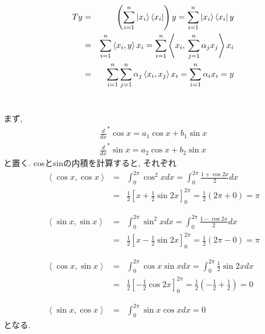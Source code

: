 \documentclass[a4paper,11pt]{jsarticle}
\begin{document}
\section{}
\begin{eqnarray*}
  Ty &=& \left(\sum_{i=1}^n\Ket{x_i}\Bra{x_i}\right)y
    = \sum_{i=1}^n\Ket{x_i}\Bra{x_i}y \\
  &=& \sum_{i=1}^n\left<x_i, y\right>x_i
    = \sum_{i=1}^n\left<x_i, \hspace{2pt}\sum_{j=1}^n\alpha_j x_j\right>x_i \\
  &=& \sum_{i=1}^n\sum_{j=1}^n\alpha_j\left<x_i, x_j\right>x_i
    = \sum_{i=1}^n\alpha_ix_i = y
\end{eqnarray*}

\section{}
まず, 
\begin{eqnarray*}
  \frac{d}{dx}^*\cos{x} = a_1\cos{x} + b_1\sin{x} \\
  \frac{d}{dx}^*\sin{x} = a_2\cos{x} + b_2\sin{x}
\end{eqnarray*}
と置く. cosとsinの内積を計算すると, それぞれ
\begin{eqnarray*}
  \left<\cos{x}, \cos{x}\right> &=& \int_0^{2\pi}\cos^2{x}dx = \int_0^{2\pi}\frac{1+\cos{2x}}{2}dx \\
  &=& \frac{1}{2}\left[x + \frac{1}{2}\sin{2x}\right]_0^{2\pi}
  = \frac{1}{2}\left(2\pi + 0\right) = \pi \\
  \\\\
  \left<\sin{x}, \sin{x}\right> &=& \int_0^{2\pi}\sin^2{x}dx = \int_0^{2\pi}\frac{1-\cos{2x}}{2}dx \\
  &=& \frac{1}{2}\left[x - \frac{1}{2}\sin{2x}\right]_0^{2\pi}
  = \frac{1}{2}\left(2\pi - 0\right) = \pi \\
  \\\\
  \left<\cos{x}, \sin{x}\right> &=& \int_0^{2\pi}\cos{x}\sin{x}dx
    = \int_0^{2\pi}\frac{1}{2}\sin{2x}dx \\
  &=& \frac{1}{2}\left[-\frac{1}{2}\cos{2x}\right]_0^{2\pi}
  = \frac{1}{2}\left(-\frac{1}{2} + \frac{1}{2}\right) = 0 \\
  \\\\
  \left<\sin{x}, \cos{x}\right> &=& \int_0^{2\pi}\sin{x}\cos{x}dx = 0
\end{eqnarray*}
となる. 
\end{document}
